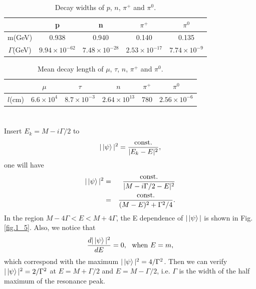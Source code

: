 \documentclass[11pt]{article}
\begin{document}
\begin{table}[]
  \centering
  \caption{Decay widths of $p$, $n$, $\pi^+$ and $\pi^0$.}
  \label{tb:Gamma2}
  \begin{tabular}{|c|c|c|c|c|}
  \hline
                & p                      & n                     & $\pi^+$                & $\pi^0$               \\ \hline
  m(GeV)        & 0.938                  & 0.940                 & 0.140                  & 0.135                 \\ \hline
  $\Gamma$(GeV) & $9.94 \times 10^{-62}$ & $7.48\times 10^{-28}$ & $2.53 \times 10^{-17}$ & $7.74 \times 10^{-9}$ \\ \hline
  \end{tabular}
\end{table}


\begin{table}[]
  \centering
  \caption{Mean decay length of $\mu$, $\tau$, $n$, $\pi^+$ and $\pi^0$. }
  \label{tb:cm}
  \begin{tabular}{|c|c|c|c|c|c|}
  \hline
          & $\mu$             & $\tau$               & $n$                   & $\pi^+$ & $\pi^0$               \\ \hline
  $l$(cm) & $6.6 \times 10^4$ & $8.7 \times 10^{-3}$ & $2.64 \times 10^{13}$ & 780     & $2.56 \times 10^{-6}$ \\ \hline
  \end{tabular}
  \end{table}

\section{ }
Insert $E_k=M-i\Gamma/2$ to 
\begin{eqnarray}
  |\ket{\psi}|^2=\frac{{\rm const.}}{|E_k-E|^2},
\end{eqnarray}
one will have
\begin{eqnarray}
  |\ket{\psi}|^2&=&\frac{{\rm const.}}{|M- i\Gamma/2-E|^2}\nonumber \\
  &=&\frac{{\rm const.}}{(M- E)^2+\Gamma^2/4}.
\end{eqnarray}
In the region $M-4 \Gamma <E < M+ 4\Gamma$, the E dependence of $|\ket{\psi}|$ is shown in Fig.\ref{fig.1_5}. Also, we notice that
\begin{eqnarray}
  \frac{d |\ket{\psi}|^2 }{d E}=0,~~{\rm when}~E=m,
\end{eqnarray}
which correspond with the maximum $|\ket{\psi}|^2=4/\Gamma^2$. Then we can verify $|\ket{\psi}|^2=2/\Gamma^2$ at $E=M+\Gamma/2$ and $E=M-\Gamma/2$, i.e. $\Gamma$ is the width of the half maximum of the resonance peak.
\end{document}
